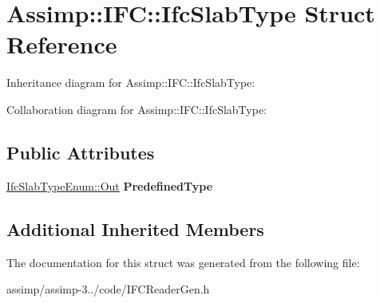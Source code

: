 \hypertarget{struct_assimp_1_1_i_f_c_1_1_ifc_slab_type}{\section{Assimp\+:\+:I\+F\+C\+:\+:Ifc\+Slab\+Type Struct Reference}
\label{struct_assimp_1_1_i_f_c_1_1_ifc_slab_type}
}


Inheritance diagram for Assimp\+:\+:I\+F\+C\+:\+:Ifc\+Slab\+Type\+:


Collaboration diagram for Assimp\+:\+:I\+F\+C\+:\+:Ifc\+Slab\+Type\+:
\subsection*{Public Attributes}
\begin{DoxyCompactItemize}
\item 
\hypertarget{struct_assimp_1_1_i_f_c_1_1_ifc_slab_type_afc94391bead4ecb3629c9f787b4c88d6}{\hyperlink{classboost_1_1shared__ptr}{Ifc\+Slab\+Type\+Enum\+::\+Out} {\bfseries Predefined\+Type}}\label{struct_assimp_1_1_i_f_c_1_1_ifc_slab_type_afc94391bead4ecb3629c9f787b4c88d6}

\end{DoxyCompactItemize}
\subsection*{Additional Inherited Members}


The documentation for this struct was generated from the following file\+:\begin{DoxyCompactItemize}
\item 
assimp/assimp-\/3../code/I\+F\+C\+Reader\+Gen.\+h\end{DoxyCompactItemize}
